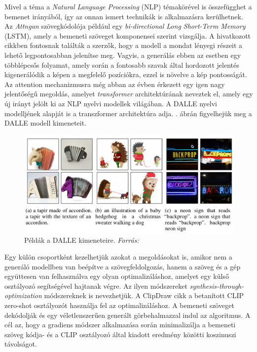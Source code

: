Mivel a téma a \textit{Natural Language Processing} (NLP) témakörével is összefügghet a bemenet irányából, így az onnan ismert technikák is alkalmazásra kerülhetnek.
Az \textit{Attngan} \cite{xu2018attngan} szövegkódolója például egy \textit{bi-directional Long Short-Term Memory} (LSTM), amely a bemeneti szöveget komponensei szerint vizsgálja. A hivatkozott cikkben fontosnak találták a szerzők, hogy a modell a mondat lényegi részeit a lehető legpontosabban jelenítse meg. Vagyis, a generálás ebben az esetben egy többlépcsős folyamat, amely során a fontosabb szavak által hordozott jelentés kigenerálódik a képen a megfelelő pozíciókra, ezzel is növelve a kép pontosságát. Az attention mechanizmusra még abban az évben érkezett egy igen nagy jelentőségű megoldás, amelyet \textit{transformer} architektúrának \cite{vaswani2017attention} neveztek el, amely egy új irányt jelölt ki az NLP nyelvi modellek világában. A DALLE \cite{ramesh2021zero} nyelvi modelljének alapját is a transzformer architektúra adja. . ábrán figyelhejük meg a DALLE modell kimeneteit.

\begin{figure}[h]
	\centering
	\includegraphics[width=13cm]{images/dalle.png}
	\caption{Példák a DALLE kimeneteire. \textit{Forrás:} \cite{ramesh2021zero}}
	\label{fig:dalle}
\end{figure}

Egy külön csoportként kezelhetjük azokat a megoldásokat is, amikor nem a generáló modellben van beépítve a szövegfeldolgozás, hanem a szöveg és a gép együttesen van felhasználva egy olyan optimalizáláshoz, amelyet egy külső osztályozó segítségével hajtanak végre. Az ilyen módszereket \textit{synthesis-through-optimization} módszereknek \cite{frans2021clipdraw} is nevezhetjük. A ClipDraw cikk a betanított CLIP zero-shot osztályozót használja fel az optimalizáláshoz. A bemeneti szöveget dekódolják és egy véletlenszerűen generált görbehalmazzal indul az algoritmus. A cél az, hogy a gradiens módszer alkalmazása során minimalizálja a bemeneti szöveg kódja- és a CLIP osztályozó által kiadott eredmény közötti koszinuszi távolságot.

